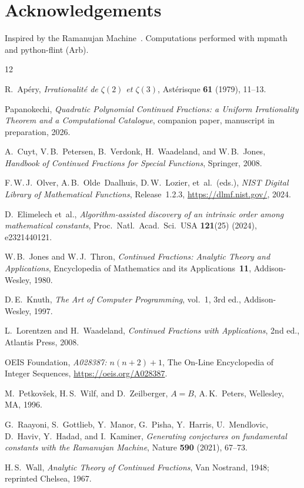 \documentclass[11pt,a4paper]{article}
\theoremstyle{plain}
\theoremstyle{definition}
\theoremstyle{remark}
\begin{document}
\section*{Acknowledgements}

Inspired by the Ramanujan Machine~\cite{raayoni2021,elimelech2024}.
Computations performed with mpmath and python-flint (Arb).

\begin{thebibliography}{12}

R.~Ap\'ery,
\textit{Irrationalit\'e de $\zeta(2)$ et $\zeta(3)$},
Ast\'erisque \textbf{61} (1979), 11--13.

Papanokechi,
\textit{Quadratic Polynomial Continued Fractions: a Uniform
Irrationality Theorem and a Computational Catalogue},
companion paper, manuscript in preparation, 2026.

A.~Cuyt, V.\,B.~Petersen, B.~Verdonk, H.~Waadeland,
and W.\,B.~Jones,
\emph{Handbook of Continued Fractions for Special Functions},
Springer, 2008.

F.\,W.\,J.~Olver, A.\,B.~Olde~Daalhuis, D.\,W.~Lozier,
et~al.\ (eds.),
\emph{NIST Digital Library of Mathematical Functions},
Release~1.2.3, \url{https://dlmf.nist.gov/}, 2024.

D.~Elimelech et~al.,
\textit{Algorithm-assisted discovery of an intrinsic order among
mathematical constants},
Proc.\ Natl.\ Acad.\ Sci.\ USA \textbf{121}(25) (2024),
e2321440121.

W.\,B.~Jones and W.\,J.~Thron,
\emph{Continued Fractions: Analytic Theory and Applications},
Encyclopedia of Mathematics and its Applications~\textbf{11},
Addison-Wesley, 1980.

D.\,E.~Knuth,
\emph{The Art of Computer Programming},
vol.~1, 3rd ed., Addison-Wesley, 1997.

L.~Lorentzen and H.~Waadeland,
\emph{Continued Fractions with Applications},
2nd ed., Atlantis Press, 2008.

OEIS Foundation,
\textit{A028387: $n(n{+}2)+1$},
The On-Line Encyclopedia of Integer Sequences,
\url{https://oeis.org/A028387}.

M.~Petkov\v{s}ek, H.\,S.~Wilf, and D.~Zeilberger,
\emph{$A=B$}, A.\,K.~Peters, Wellesley, MA, 1996.

G.~Raayoni, S.~Gottlieb, Y.~Manor, G.~Pisha, Y.~Harris,
U.~Mendlovic, D.~Haviv, Y.~Hadad, and I.~Kaminer,
\textit{Generating conjectures on fundamental constants with the
Ramanujan Machine},
Nature \textbf{590} (2021), 67--73.

H.\,S.~Wall,
\emph{Analytic Theory of Continued Fractions},
Van Nostrand, 1948; reprinted Chelsea, 1967.

\end{thebibliography}
\end{document}
